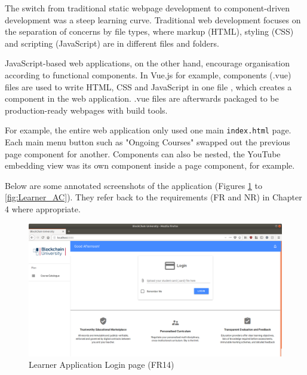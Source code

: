 The switch from traditional static webpage development to component-driven development was a steep learning curve.
Traditional web development focuses on the separation of concerns by file types, where markup (HTML), 
styling (CSS) and scripting (JavaScript) are in different files and folders.

JavaScript-based web applications, on the other hand, encourage organisation according to functional components. 
In Vue.js for example, components (.vue) files are used to write HTML, CSS and JavaScript in one file \citep{vue2017components}, 
which creates a component in the web application. .vue files are afterwards packaged to be production-ready webpages with build tools.

For example, the entire web application only used one main \texttt{index.html} page. Each main menu button 
such as "Ongoing Courses" swapped out the previous page component for another. Components can also be nested, 
the YouTube embedding view was its own component inside a page component, for example.

Below are some annotated screenshots of the application (Figures \ref{fig:Learner_login} to 
\ref{fig:Learner_AC}). They refer back to the requirements (FR and NR) in Chapter 4 where appropriate.

\begin{figure}[!ht]
	\centering
	\includegraphics[width=1.05\textwidth]{Learner_login}
	\caption[Learner Application Login page]
	{Learner Application Login page (FR14)}
	\label{fig:Learner_login}
\end{figure}

